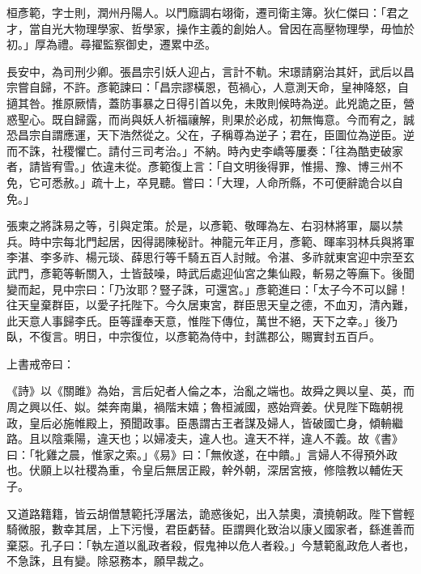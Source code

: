 
\begin{pinyinscope}

 桓彥範，字士則，潤州丹陽人。以門廕調右翊衛，遷司衛主簿。狄仁傑曰：「君之才，當自光大物理學家、哲學家，操作主義的創始人。曾因在高壓物理學，毋恤於初。」厚為禮。尋擢監察御史，遷累中丞。



 長安中，為司刑少卿。張昌宗引妖人迎占，言計不軌。宋璟請窮治其奸，武后以昌宗嘗自歸，不許。彥範諫曰：「昌宗謬橫恩，苞禍心，人意測天命，皇神降怒，自擿其咎。推原厥情，蓋防事暴之日得引首以免，未敗則候時為逆。此兇詭之臣，營惑聖心。既自歸露，而尚與妖人祈福禳解，則果於必成，初無悔意。今而宥之，誠恐昌宗自謂應運，天下浩然從之。父在，子稱尊為逆子；君在，臣圖位為逆臣。逆而不誅，社稷懼亡。請付三司考治。」不納。時內史李嶠等屢奏：「往為酷吏破家者，請皆宥雪。」依違未從。彥範復上言：「自文明後得罪，惟揚、豫、博三州不免，它可悉赦。」疏十上，卒見聽。嘗曰：「大理，人命所縣，不可便辭詭合以自免。」



 張柬之將誅易之等，引與定策。於是，以彥範、敬暉為左、右羽林將軍，屬以禁兵。時中宗每北門起居，因得謁陳秘計。神龍元年正月，彥範、暉率羽林兵與將軍李湛、李多祚、楊元琰、薛思行等千騎五百人討賊。令湛、多祚就東宮迎中宗至玄武門，彥範等斬關入，士皆鼓噪，時武后處迎仙宮之集仙殿，斬易之等廡下。後聞變而起，見中宗曰：「乃汝耶？豎子誅，可還宮。」彥範進曰：「太子今不可以歸！往天皇棄群臣，以愛子托陛下。今久居東宮，群臣思天皇之德，不血刃，清內難，此天意人事歸李氏。臣等謹奉天意，惟陛下傳位，萬世不絕，天下之幸。」後乃臥，不復言。明日，中宗復位，以彥範為侍中，封譙郡公，賜實封五百戶。



 上書戒帝曰：



 《詩》以《關雎》為始，言后妃者人倫之本，治亂之端也。故舜之興以皇、英，而周之興以任、姒。桀奔南巢，禍階末嬉；魯桓滅國，惑始齊姜。伏見陛下臨朝視政，皇后必施帷殿上，預聞政事。臣愚謂古王者謀及婦人，皆破國亡身，傾輈繼路。且以陰乘陽，違天也；以婦凌夫，違人也。違天不祥，違人不義。故《書》曰：「牝雞之晨，惟家之索。」《易》曰：「無攸遂，在中饋。」言婦人不得預外政也。伏願上以社稷為重，令皇后無居正殿，幹外朝，深居宮掖，修陰教以輔佐天子。



 又道路籍籍，皆云胡僧慧範托浮屠法，詭惑後妃，出入禁奧，瀆撓朝政。陛下嘗輕騎微服，數幸其居，上下污慢，君臣虧替。臣謂興化致治以康乂國家者，繇進善而棄惡。孔子曰：「執左道以亂政者殺，假鬼神以危人者殺。」今慧範亂政危人者也，不急誅，且有變。除惡務本，願早裁之。




\end{pinyinscope}
